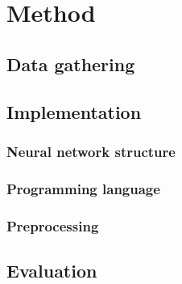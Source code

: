 \chapter{Method}\label{cha:intro}

\section{Data gathering}\label{sec:research:history}
\section{Implementation}\label{sec:research:history}
\subsection{Neural network structure}\label{sec:research:history}
\subsection{Programming language}\label{sec:research:history}
\subsection{Preprocessing}\label{sec:research:history}
\section{Evaluation}\label{sec:research:history}
